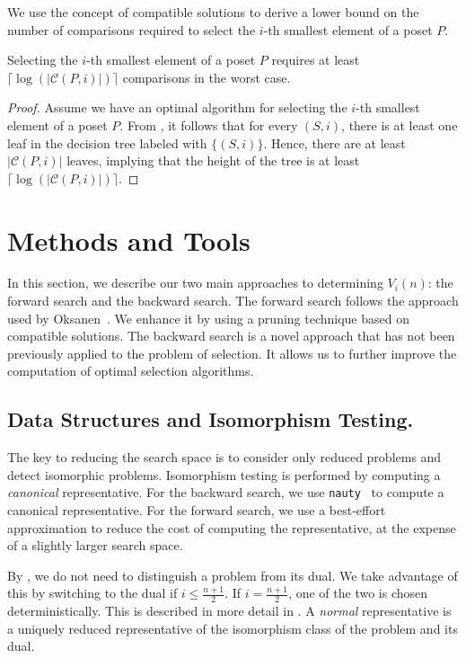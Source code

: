 \documentclass[twoside,leqno,twocolumn]{article}
\begin{document}
We use the concept of compatible solutions to derive a lower bound on the number of comparisons required to select the $i$-th smallest element of a poset $P$.

\begin{theorem}\label{theorem:compatible_log}
  Selecting the $i$-th smallest element of a poset $P$ requires at least $\lceil\log(|\mathcal{C}(P, i)|)\rceil$ comparisons in the worst case.
\end{theorem}

\begin{proof}
  Assume we have an optimal algorithm for selecting the $i$-th smallest element of a poset $P$.
  From , it follows that for every $(S, i)$, there is at least one leaf in the decision tree labeled with $\{(S, i)\}$.
  Hence, there are at least $|\mathcal{C}(P, i)|$ leaves, implying that the height of the tree is at least $\lceil\log(|\mathcal{C}(P, i)|)\rceil$.
\end{proof}


\section{Methods and Tools}

In this section, we describe our two main approaches to determining $V_i(n)$: the forward search and the backward search.
The forward search follows the approach used by Oksanen~\cite{Oksanen2006}.
We enhance it by using a pruning technique based on compatible solutions.
The backward search is a novel approach that has not been previously applied to the problem of selection.
It allows us to further improve the computation of optimal selection algorithms.%

\subsection{Data Structures and Isomorphism Testing.}
The key to reducing the search space is to consider only reduced problems and detect isomorphic problems.
Isomorphism testing is performed by computing a \emph{canonical} representative.
For the backward search, we use \texttt{nauty}~\cite{MCKAY201494} to compute a canonical representative.
For the forward search, we use a best-effort approximation to reduce the cost of computing the representative, at the expense of a slightly larger search space.

By , we do not need to distinguish a problem from its dual.
We take advantage of this by switching to the dual if $i \leq \frac{n+1}{2}$.
If $i = \frac{n+1}{2}$, one of the two is chosen deterministically.
This is described in more detail in .
A \emph{normal} representative is a uniquely reduced representative of the isomorphism class of the problem and its dual.
\end{document}
